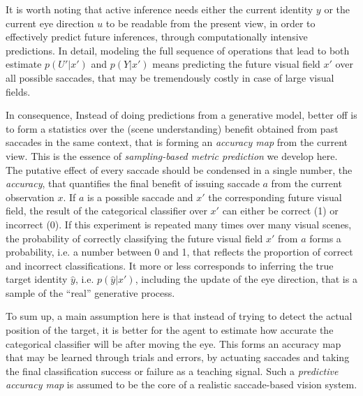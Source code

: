 
It is worth noting that active inference needs either the current identity $y$ or the current eye direction $u$ to be readable from the present view, in order to effectively predict future inferences, through computationally intensive predictions. In detail, modeling the full sequence of operations that lead to both estimate $p(U'|x')$ and $p(Y|x')$ means predicting the future visual field $x'$ over all possible saccades, that may be tremendously costly in case of large visual fields. 

In consequence, Instead of doing predictions from a generative model, better off is to form a statistics over the (scene understanding) benefit obtained from past saccades in the same context, that is forming an \emph{accuracy map} from the current view. This is the essence of \emph{sampling-based metric prediction} we develop here. The putative effect of every saccade should be condensed in a single number, the \emph{accuracy}, that quantifies the final benefit of issuing saccade $a$ %
from the current observation $x$. If $a$ is a possible saccade and $x'$ the corresponding future visual field, the result of the categorical classifier over $x'$ can either be correct (1) or incorrect (0).
If this experiment is repeated many times over many visual scenes, the probability of correctly classifying the future visual field $x'$ from $a$ forms a probability, i.e. a number between 0 and 1, that reflects the proportion of correct and incorrect classifications.
It more or less corresponds to inferring the true target identity $\hat{y}$, i.e. $p(\hat{y}|x')$, including the update of the eye direction, that is a sample of the ``real'' generative process.

To sum up, a main assumption here is that instead of trying to detect the actual position of the target, it is better for the agent to estimate how accurate the categorical classifier will be after moving the eye. This forms an accuracy map that may be learned through trials and errors, by actuating saccades %
and taking the final classification success or failure as a teaching signal.
Such a \emph{predictive accuracy map} is assumed to be the core of a realistic saccade-based vision system.

